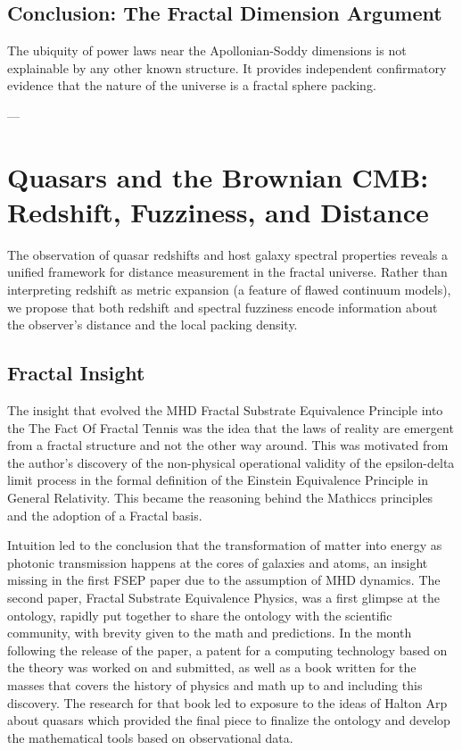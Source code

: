\documentclass[11pt,a4paper]{article}
\begin{document}
      \vspace{0.5em}

  \subsection{Conclusion: The Fractal Dimension Argument}

    The ubiquity of power laws near the Apollonian-Soddy dimensions is not explainable by any other known structure. It provides independent confirmatory evidence that the nature of the universe is a fractal sphere packing.

---


\section{Quasars and the Brownian CMB: Redshift, Fuzziness, and Distance}

   The observation of quasar redshifts and host galaxy spectral properties reveals a unified framework for distance measurement in the fractal universe. Rather than interpreting redshift as metric expansion (a feature of flawed continuum models), we propose that both redshift and spectral fuzziness encode information about the observer's distance and the local packing density.

  \subsection{Fractal Insight}
    The insight that evolved the MHD Fractal Substrate Equivalence Principle into the The Fact Of Fractal Tennis was the idea that the laws of reality are emergent from a fractal structure and not the other way around. This was motivated from the author's discovery of the non-physical operational validity of the epsilon-delta limit process in the formal definition of the Einstein Equivalence Principle in General Relativity. This became the reasoning behind the Mathiccs principles and the adoption of a Fractal basis. 

    Intuition led to the conclusion that the transformation of matter into energy as photonic transmission happens at the cores of galaxies and atoms, an insight missing in the first FSEP paper due to the assumption of MHD dynamics. The second paper, Fractal Substrate Equivalence Physics, was a first glimpse at the ontology, rapidly put together to share the ontology with the scientific community, with brevity given to the math and predictions. In the month following the release of the paper, a patent for a computing technology based on the theory was worked on and submitted, as well as a book written for the masses that covers the history of physics and math up to and including this discovery. The research for that book led to exposure to the ideas of Halton Arp about quasars which provided the final piece to finalize the ontology and develop the mathematical tools based on observational data. 
\end{document}
